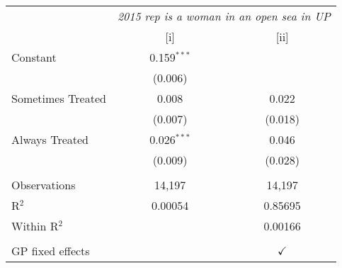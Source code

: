 
\begingroup
\centering
\begin{tabular}{lcc}
   \toprule
    & \multicolumn{2}{c}{\textit{2015 rep is a woman in an open sea in UP}}\\
                     & [i]           & [ii]\\  
   \midrule 
   Constant          & 0.159$^{***}$ &   \\   
                     & (0.006)       &   \\   
   Sometimes Treated & 0.008         & 0.022\\   
                     & (0.007)       & (0.018)\\   
   Always Treated    & 0.026$^{***}$ & 0.046\\   
                     & (0.009)       & (0.028)\\   
    \\
   Observations      & 14,197        & 14,197\\  
   R$^2$             & 0.00054       & 0.85695\\  
   Within R$^2$      &               & 0.00166\\  
    \\
   GP fixed effects  &               & $\checkmark$\\   
   \bottomrule
\end{tabular}
\par\endgroup


